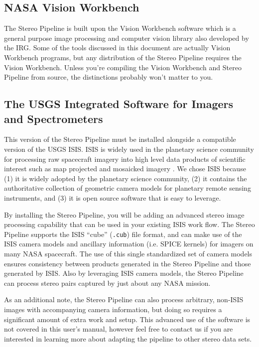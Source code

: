 \subsection{NASA Vision Workbench}

The Stereo Pipeline is built upon the Vision Workbench software
which is a general purpose image processing and computer vision
library also developed by the \ac{IRG}.  Some of the tools discussed
in this document are actually Vision Workbench programs, but any
distribution of the Stereo Pipeline requires the Vision Workbench.
Unless you're compiling the Vision Workbench and Stereo Pipeline from
source, the distinctions probably won't matter to you.  


\subsection{The USGS Integrated Software for Imagers and Spectrometers}

This version of the Stereo Pipeline must be installed alongside a
compatible version of the \ac{USGS} \ac{ISIS}. \ac{ISIS} is widely
used in the planetary science community for processing raw spacecraft
imagery into high level data products of scientific interest such as
map projected and mosaicked imagery \cite{2004LPI....35.2039A,
  1997LPI....28..387G, ISIS_website}.  We chose \ac{ISIS} because (1)
it is widely adopted by the planetary science community, (2) it
contains the authoritative collection of geometric camera models for
planetary remote sensing instruments, and (3) it is open source
software that is easy to leverage.

By installing the Stereo Pipeline, you will be adding an advanced
stereo image processing capability that can be used in your existing
\ac{ISIS} work flow.  The Stereo Pipeline supports the \ac{ISIS}
``cube'' (\texttt{.cub}) file format, and can make use of the \ac{ISIS}
camera models and ancillary information (i.e. SPICE kernels) for
imagers on many \ac{NASA} spacecraft.  The use of this single standardized
set of camera models ensures consistency between products generated
in the Stereo Pipeline and those generated by \ac{ISIS}.  Also by
leveraging \ac{ISIS} camera models, the Stereo Pipeline can process
stereo pairs captured by just about any \ac{NASA} mission.

As an additional note, the Stereo Pipeline can also process arbitrary,
non-ISIS images with accompanying camera information, but doing so
requires a significant amount of extra work and setup.  This advanced
use of the software is not covered in this user's manual, however feel
free to contact us if you are interested in learning more about
adapting the pipeline to other stereo data sets.

